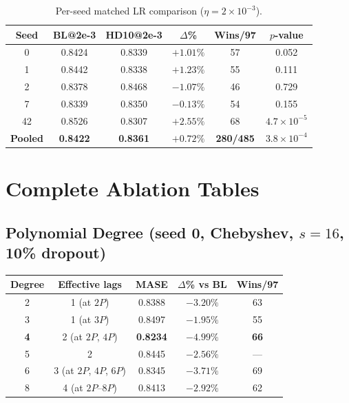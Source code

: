 \documentclass[letterpaper]{article}
\begin{document}
\begin{table}[h]
\centering
\caption{Per-seed matched LR comparison ($\eta = 2 \times 10^{-3}$).}
\small
\begin{tabular}{cccccc}
\toprule
\textbf{Seed} & \textbf{BL@2e-3} & \textbf{HD10@2e-3} & \textbf{$\Delta$\%} & \textbf{Wins/97} & \textbf{$p$-value} \\
\midrule
0 & 0.8424 & 0.8339 & $+1.01\%$ & 57 & 0.052 \\
1 & 0.8442 & 0.8338 & $+1.23\%$ & 55 & 0.111 \\
2 & 0.8378 & 0.8468 & $-1.07\%$ & 46 & 0.729 \\
7 & 0.8339 & 0.8350 & $-0.13\%$ & 54 & 0.155 \\
42 & 0.8526 & 0.8307 & $+2.55\%$ & 68 & $4.7 \times 10^{-5}$ \\
\midrule
\textbf{Pooled} & \textbf{0.8422} & \textbf{0.8361} & $+0.72\%$ & \textbf{280/485} & $3.8 \times 10^{-4}$ \\
\bottomrule
\end{tabular}
\end{table}

\section{Complete Ablation Tables}
\label{app:ablations}

\subsection{Polynomial Degree (seed 0, Chebyshev, $s=16$, 10\% dropout)}

\begin{table}[h]
\centering
\small
\begin{tabular}{ccccc}
\toprule
\textbf{Degree} & \textbf{Effective lags} & \textbf{MASE} & \textbf{$\Delta$\% vs BL} & \textbf{Wins/97} \\
\midrule
2 & 1 (at $2P$) & 0.8388 & $-3.20\%$ & 63 \\
3 & 1 (at $3P$) & 0.8497 & $-1.95\%$ & 55 \\
\textbf{4} & 2 (at $2P$, $4P$) & \textbf{0.8234} & $-4.99\%$ & \textbf{66} \\
5 & 2 & 0.8445 & $-2.56\%$ & --- \\
6 & 3 (at $2P$, $4P$, $6P$) & 0.8345 & $-3.71\%$ & 69 \\
8 & 4 (at $2P$--$8P$) & 0.8413 & $-2.92\%$ & 62 \\
\bottomrule
\end{tabular}
\end{table}
\end{document}
